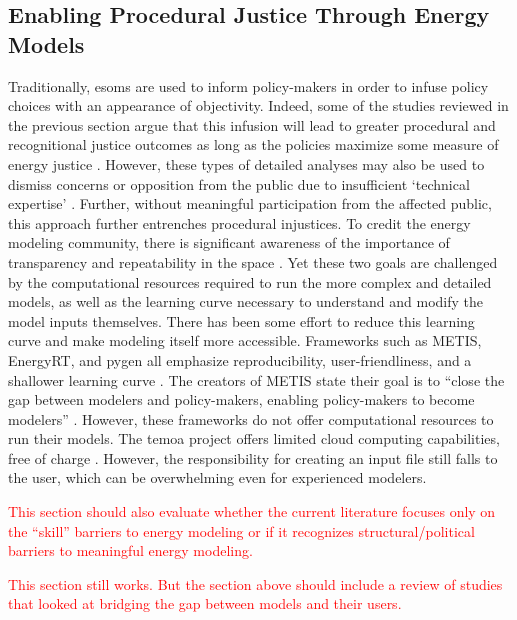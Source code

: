 \subsection{Enabling Procedural Justice Through Energy Models}

Traditionally, \acp{esom} are used to inform policy-makers \cite{li_open_2020}
in order to infuse policy choices with an appearance of objectivity. Indeed,
some of the studies reviewed in the previous section argue that this infusion
will lead to greater procedural and recognitional justice outcomes as long as
the policies maximize some measure of energy justice
\cite{chapman_prioritizing_2018, heffron_resolving_2015}. However, these types
of detailed analyses may also be used to dismiss concerns or opposition from the
public due to insufficient `technical expertise' \cite{johnson_dakota_2021}.
Further, without meaningful participation from the affected public, this
approach further entrenches procedural injustices. To credit the energy modeling
community, there is significant awareness of the importance of transparency and
repeatability in the space \cite{decarolis_case_2012, pfenninger_energy_2014,
pfenninger_openmod_2022, forster_open_2022, hilpert_open_2018}. Yet these two
goals are challenged by the computational resources required to run the more
complex and detailed models, as well as the learning curve necessary to
understand and modify the model inputs themselves. There has been some effort to
reduce this learning curve and make modeling itself more accessible. Frameworks
such as METIS, EnergyRT, and \ac{pygen} all emphasize reproducibility,
user-friendliness, and a shallower learning curve \cite{sakellaris_metis_2018,
lugovoy_energyrt_2022, dotson_python_2021}. The creators of METIS state their
goal is to ``close the gap between modelers and policy-makers, enabling
policy-makers to become modelers'' \cite{sakellaris_metis_2018}. However, these
frameworks do not offer computational resources to run their models. The
\ac{temoa} project offers limited cloud computing capabilities, free of charge
\cite{temoa_project_temoa_2023}. However, the responsibility for creating an
input file still falls to the user, which can be overwhelming even for
experienced modelers. 

\textcolor{red}{This section should also evaluate whether the current literature
focuses only on the ``skill'' barriers to energy modeling or if it recognizes
structural/political barriers to meaningful energy modeling.}

\textcolor{red}{This section still works. But the section above should include a
review of studies that looked at bridging the gap between models and their users.}

